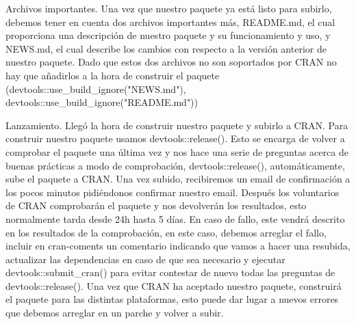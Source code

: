Archivos importantes.
Una vez que nuestro paquete ya est\'a listo para subirlo, debemos tener en cuenta dos archivos
importantes m\'as, README.md, el cual proporciona una descripci\'on de nuestro paquete y su
funcionamiento y uso, y NEWS.md, el cual describe los cambios con respecto a la versi\'on
anterior de nuestro paquete. Dado que estos dos archivos no son soportados por CRAN no
hay que a\~nadirlos a la hora de construir el paquete (devtools::use\_build\_ignore("NEWS.md"),
devtools::use\_build\_ignore("README.md"))

Lanzamiento.
Lleg\'o la hora de construir nuestro paquete y subirlo a CRAN. Para construir nuestro paquete
usamos devtools::release(). Esto se encarga de volver a comprobar el paquete una \'ultima
vez y nos hace una serie de preguntas acerca de buenas pr\'acticas a modo de comprobaci\'on,
devtools::release(), autom\'aticamente, sube el paquete a CRAN.
Una vez subido, recibiremos un email de confirmaci\'on a los pocos minutos pidi\'endonos
confirmar nuestro email. Despu\'es los voluntarios de CRAN comprobar\'an el paquete y nos
devolver\'an los resultados, esto normalmente tarda desde 24h hasta 5 d\'ias.
En caso de fallo, este vendr\'a descrito en los resultados de la comprobaci\'on, en este caso,
debemos arreglar el fallo, incluir en cran-coments un comentario indicando que vamos a
hacer una resubida, actualizar las dependencias en caso de que sea necesario y ejecutar
devtools::submit\_cran() para evitar contestar de nuevo todas las preguntas de
devtools::release().
Una vez que CRAN ha aceptado nuestro paquete, construir\'a el paquete para las distintas
plataformas, esto puede dar lugar a nuevos errores que debemos arreglar en un parche y
volver a subir.